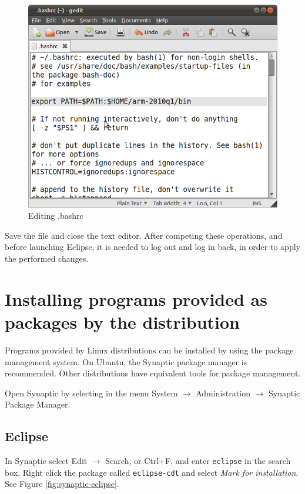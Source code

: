 \documentclass[a4paper, 10pt]{article}
\begin{document}
    \begin{figure}[H]
    \centering
        \includegraphics[width=\textwidth]{./png-install-guide/editing-bashrc.png}
        \caption{Editing .bashrc}
        \label{fig:editing-bashrc}
    \end{figure}

Save the file and close the text editor.
After competing these operations, and before launching Eclipse, it is needed to
log out and log in back, in order to apply the performed changes.

\section{Installing programs provided as packages by the distribution}

Programs provided by Linux distributions can be installed by using the package management system.
On Ubuntu, the Synaptic package manager is recommended.
Other distributions have equivalent tools for package management.

Open Synaptic by selecting in the menu System $\rightarrow$ Administration $\rightarrow$
Synaptic Package Manager.

\subsection{Eclipse}

In Synaptic select Edit $\rightarrow$ Search, or Ctrl+F, and enter \verb+eclipse+
in the search box. Right click the package called
\verb+eclipse-cdt+ and select \emph{Mark for installation}.
See Figure \ref{fig:synaptic-eclipse}.
\end{document}
